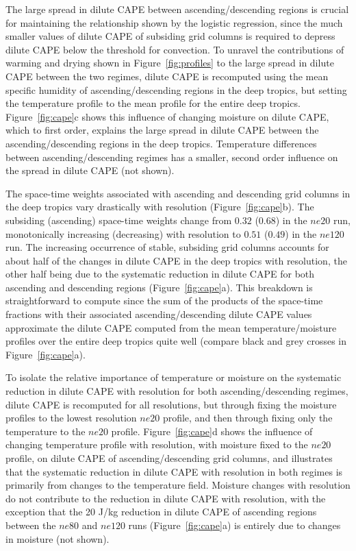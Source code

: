 \documentclass[alpha-refs]{wiley-article}
\begin{document}
The large spread in dilute CAPE between ascending/descending regions is crucial for maintaining the relationship shown by the logistic regression, since the much smaller values of dilute CAPE of subsiding grid columns is required to depress dilute CAPE below the threshold for convection. To unravel the contributions of warming and drying shown in Figure~\ref{fig:profiles} to the large spread in dilute CAPE between the two regimes, dilute CAPE is recomputed using the mean specific humidity of ascending/descending regions in the deep tropics, but setting the temperature profile to the mean profile for the entire deep tropics. Figure~\ref{fig:cape}c shows this influence of changing moisture on dilute CAPE, which to first order, explains the large spread in dilute CAPE between the ascending/descending regions in the deep tropics. Temperature differences between ascending/descending regimes has a smaller, second order influence on the spread in dilute CAPE (not shown).

The space-time weights associated with ascending and descending grid columns in the deep tropics vary drastically with resolution (Figure~\ref{fig:cape}b). The subsiding (ascending) space-time weights change from $0.32$ ($0.68$) in the $ne20$ run, monotonically increasing (decreasing) with resolution to $0.51$ ($0.49$) in the $ne120$ run. The increasing occurrence of stable, subsiding grid columns accounts for about half of the changes in dilute CAPE in the deep tropics with resolution, the other half being due to the systematic reduction in dilute CAPE for both ascending and descending regions (Figure~\ref{fig:cape}a). This breakdown is straightforward to compute since the sum of the products of the space-time fractions with their associated ascending/descending dilute CAPE values approximate the dilute CAPE computed from the mean temperature/moisture profiles over the entire deep tropics quite well (compare black and grey crosses in Figure~\ref{fig:cape}a). 

To isolate the relative importance of temperature or moisture on the systematic reduction in dilute CAPE with resolution for both ascending/descending regimes, dilute CAPE is recomputed for all resolutions, but through fixing the moisture profiles to the lowest resolution $ne20$ profile, and then through fixing only the temperature to the $ne20$ profile. Figure~\ref{fig:cape}d shows the influence of changing temperature profile with resolution, with moisture fixed to the $ne20$ profile, on dilute CAPE of ascending/descending grid columns, and illustrates that the systematic reduction in dilute CAPE with resolution in both regimes is primarily from changes to the temperature field. Moisture changes with resolution do not contribute to the reduction in dilute CAPE with resolution, with the exception that the 20 J/kg reduction in dilute CAPE of ascending regions between the $ne80$ and $ne120$ runs (Figure~\ref{fig:cape}a) is entirely due to changes in moisture (not shown).
\end{document}
